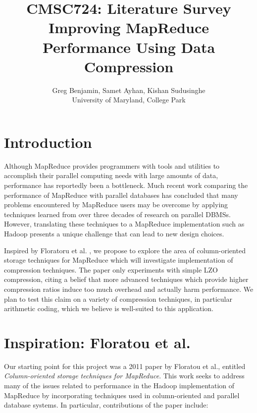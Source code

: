 \documentclass[twocolumn]{article}
\title{CMSC724: Literature Survey \\
Improving MapReduce Performance Using Data Compression}
\author{Greg Benjamin, Samet Ayhan, Kishan Sudusinghe \\
University of Maryland, College Park}
\date{}
\begin{document}
\maketitle

\section{Introduction}

Although MapReduce provides programmers with tools and utilities to accomplish their parallel
computing needs with large amounts of data, performance has reportedly been a bottleneck.
Much recent work comparing the performance of MapReduce with parallel databases has concluded
that many problems encountered by MapReduce users may be overcome by
applying techniques learned from over three decades of research on parallel DBMSs. However,
translating these techniques to a MapReduce implementation such as Hadoop presents a unique
challenge that can lead to new design choices.

Inspired by Floratoru et al. \cite{ref:floratou}, we propose to explore the area of column-oriented storage
techniques for MapReduce which will investigate implementation of compression techniques. The paper only
experiments with simple LZO compression, citing a belief that more advanced techniques which provide
higher compression ratios induce too much overhead and actually harm performance. We plan to test
this claim on a variety of compression techniques, in particular arithmetic coding, which we believe is
well-suited to this application.

\section{Inspiration: Floratou et al.}

Our starting point for this project was a 2011 paper by Floratou et al., entitled
\emph{Column-oriented storage techniques for MapReduce}.  This work
seeks to address many of the issues related to performance in the Hadoop implementation
of MapReduce by incorporating techniques used in column-oriented and parallel database
systems.  In particular, contributions of the paper include:
\end{document}
